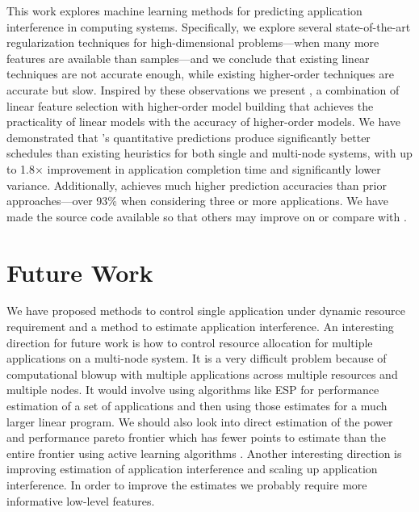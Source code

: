 This work explores machine learning methods for predicting
application interference in computing systems.  Specifically, we
explore several state-of-the-art regularization techniques for
high-dimensional problems---when many more features are available than
samples---and we conclude that existing linear techniques are not
accurate enough, while existing higher-order techniques are accurate
but slow.  Inspired by these observations we present \SYSTEMESP{}, a
combination of linear feature selection with higher-order model
building that achieves the practicality of linear models with the
accuracy of higher-order models.  We have demonstrated that
\SYSTEMESP{}'s quantitative predictions produce significantly better
schedules than existing heuristics for both single and multi-node
systems, with up to 1.8$\times$ improvement in application completion
time and significantly lower variance.  Additionally, \SYSTEMESP{}
achieves much higher prediction accuracies than prior
approaches---over 93\% when considering three or more applications.
We have made the source code available so that others may improve on
or compare with \SYSTEMESP{}.

\section{Future Work}
We have proposed methods to control single application under dynamic resource
requirement and a method to estimate application interference. An interesting
direction for future work is how to control resource allocation for multiple
applications on a multi-node system. It is a very difficult problem because of
computational blowup with multiple applications across multiple resources and
multiple nodes. It would involve using algorithms like ESP for performance
estimation of a set of applications and then using those estimates for a much
larger linear program. We should also look into direct estimation of the power and
performance pareto frontier which has fewer points to estimate than the entire frontier
using active learning algorithms \cite{hsu2010algorithms}.
Another interesting direction is improving estimation of application interference
and scaling up application interference. In order to improve the estimates we
probably require more informative low-level features.
